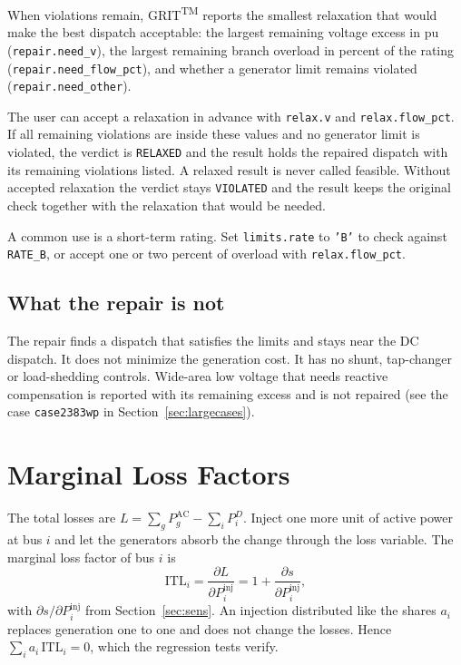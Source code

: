 \documentclass[a4paper,11pt]{article}
\newcommand{\TM}{\textsuperscript{TM}}
\newcommand{\GRIT}{GRIT\TM}
\newcommand{\opt}[1]{\texttt{#1}}
\begin{document}
When violations remain, \GRIT{} reports the smallest relaxation that would make the best dispatch acceptable: the largest remaining voltage excess in pu (\texttt{repair.need\_v}), the largest remaining branch overload in percent of the rating (\texttt{repair.need\_flow\_pct}), and whether a generator limit remains violated (\texttt{repair.need\_other}).

The user can accept a relaxation in advance with \opt{relax.v} and \opt{relax.flow\_pct}. If all remaining violations are inside these values and no generator limit is violated, the verdict is \texttt{RELAXED} and the result holds the repaired dispatch with its remaining violations listed. A relaxed result is never called feasible. Without accepted relaxation the verdict stays \texttt{VIOLATED} and the result keeps the original check together with the relaxation that would be needed.

A common use is a short-term rating. Set \opt{limits.rate} to \texttt{'B'} to check against \texttt{RATE\_B}, or accept one or two percent of overload with \opt{relax.flow\_pct}.

\subsection{What the repair is not}

The repair finds a dispatch that satisfies the limits and stays near the DC dispatch. It does not minimize the generation cost. It has no shunt, tap-changer or load-shedding controls. Wide-area low voltage that needs reactive compensation is reported with its remaining excess and is not repaired (see the case \texttt{case2383wp} in Section~\ref{sec:largecases}).

\section{Marginal Loss Factors}\label{sec:price}

The total losses are $L=\sum_g P^{\mathrm{AC}}_g - \sum_i P^D_i$. Inject one more unit of active power at bus $i$ and let the generators absorb the change through the loss variable. The marginal loss factor of bus $i$ is
\[
\mathrm{ITL}_i = \frac{\partial L}{\partial P^{\mathrm{inj}}_i} = 1 + \frac{\partial s}{\partial P^{\mathrm{inj}}_i},
\]
with $\partial s/\partial P^{\mathrm{inj}}_i$ from Section~\ref{sec:sens}. An injection distributed like the shares $a_i$ replaces generation one to one and does not change the losses. Hence $\sum_i a_i\,\mathrm{ITL}_i=0$, which the regression tests verify.
\end{document}

